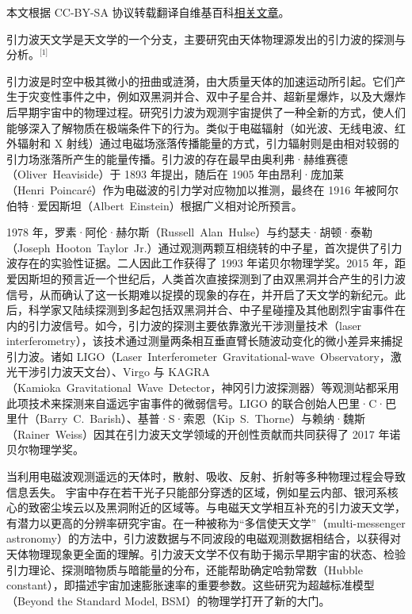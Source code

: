 
本文根据 CC-BY-SA 协议转载翻译自维基百科\href{https://en.wikipedia.org/wiki/Gravitational-wave_astronomy}{相关文章}。


引力波天文学是天文学的一个分支，主要研究由天体物理源发出的引力波的探测与分析。\(^\text{[1]}\)

引力波是时空中极其微小的扭曲或涟漪，由大质量天体的加速运动所引起。它们产生于灾变性事件之中，例如双黑洞并合、双中子星合并、超新星爆炸，以及大爆炸后早期宇宙中的物理过程。研究引力波为观测宇宙提供了一种全新的方式，使人们能够深入了解物质在极端条件下的行为。类似于电磁辐射（如光波、无线电波、红外辐射和 X 射线）通过电磁场涨落传播能量的方式，引力辐射则是由相对较弱的引力场涨落所产生的能量传播。引力波的存在最早由奥利弗·赫维赛德（Oliver~Heaviside）于 1893 年提出，随后在 1905 年由昂利·庞加莱（Henri~Poincaré）作为电磁波的引力学对应物加以推测，最终在 1916 年被阿尔伯特·爱因斯坦（Albert~Einstein）根据广义相对论所预言。

1978 年，罗素·阿伦·赫尔斯（Russell~Alan~Hulse）与约瑟夫·胡顿·泰勒（Joseph~Hooton~Taylor~Jr.）通过观测两颗互相绕转的中子星，首次提供了引力波存在的实验性证据。二人因此工作获得了 1993 年诺贝尔物理学奖。2015 年，距爱因斯坦的预言近一个世纪后，人类首次直接探测到了由双黑洞并合产生的引力波信号，从而确认了这一长期难以捉摸的现象的存在，并开启了天文学的新纪元。此后，科学家又陆续探测到多起包括双黑洞并合、中子星碰撞及其他剧烈宇宙事件在内的引力波信号。如今，引力波的探测主要依靠激光干涉测量技术（laser interferometry），该技术通过测量两条相互垂直臂长随波动变化的微小差异来捕捉引力波。诸如 LIGO（Laser~Interferometer~Gravitational-wave~Observatory，激光干涉引力波天文台）、Virgo 与 KAGRA（Kamioka~Gravitational~Wave~Detector，神冈引力波探测器）等观测站都采用此项技术来探测来自遥远宇宙事件的微弱信号。LIGO 的联合创始人巴里·C·巴里什（Barry~C.~Barish）、基普·S·索恩（Kip~S.~Thorne）与赖纳·魏斯（Rainer~Weiss）因其在引力波天文学领域的开创性贡献而共同获得了 2017 年诺贝尔物理学奖。

当利用电磁波观测遥远的天体时，散射、吸收、反射、折射等多种物理过程会导致信息丢失。  
宇宙中存在若干光子只能部分穿透的区域，例如星云内部、银河系核心的致密尘埃云以及黑洞附近的区域等。与电磁天文学相互补充的引力波天文学，有潜力以更高的分辨率研究宇宙。在一种被称为“多信使天文学”（multi-messenger astronomy）的方法中，引力波数据与不同波段的电磁观测数据相结合，以获得对天体物理现象更全面的理解。引力波天文学不仅有助于揭示早期宇宙的状态、检验引力理论、探测暗物质与暗能量的分布，还能帮助确定哈勃常数（Hubble constant），即描述宇宙加速膨胀速率的重要参数。这些研究为超越标准模型（Beyond the Standard Model, BSM）的物理学打开了新的大门。


